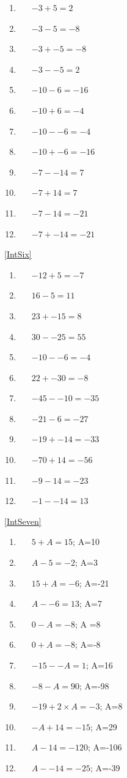 \documentclass[a4paper,12pt]{article}
\begin{document}
	\begin{multicols}{3}
		\begin{enumerate}[label=\footnotesize \roman*)]
			\item~~~$-3+5=2$
			\item~~~$-3-5=-8$
			\item~~~$-3+-5=-8$
			\item~~~$-3--5=2$
			\item~~~$-10-6=-16$
			\item~~~$-10+6=-4$
			\item~~~$-10--6=-4$
			\item~~~$-10+-6=-16$
			\item~~~$-7--14=7$
			\item~~~$-7+14=7$
			\item~~~$-7-14=-21$
			\item~~~$-7+-14=-21$
		\end{enumerate}
	\end{multicols}
\ref{IntSix}
	\begin{multicols}{3}
		\begin{enumerate}[label=\footnotesize \roman*)]
			\item~~~$-12+5=-7$
			\item~~~$ 16-5=11$
			\item~~~$23+-15=8$
			\item~~~$30--25=55$
			\item~~~$-10--6=-4$
			\item~~~$22+-30=-8$
			\item~~~$-45--10=-35$
			\item~~~$-21-6=-27$
			\item~~~$-19+-14=-33$
			\item~~~$-70+14=-56$
			\item~~~$-9-14=-23$
			\item~~~$-1--14=13$
		\end{enumerate}
	\end{multicols}
\ref{IntSeven}
	\begin{multicols}{3}
		\begin{enumerate}[label=\footnotesize \roman*)]
			\item~~~$5+A=15$; A=10
			\item~~~$ A-5=-2$; A=3
			\item~~~$15+A=-6$; A=-21
			\item~~~$A--6=13$; A=7
			\item~~~$0-A=-8$; A =8
			\item~~~$0+A=-8$; A=-8
			\item~~~$-15--A=1$; A=16
			\item~~~$-8-A=90$; A=-98
			\item~~~$-19+2\times A=-3$; A=8
			\item~~~$-A+14=-15$; A=29
			\item~~~$A-14=-120$; A=-106
			\item~~~$A--14=-25$; A=-39
		\end{enumerate}
	\end{multicols}
\end{document}
